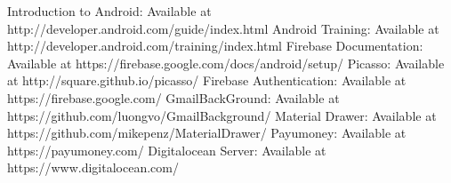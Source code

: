 \begin{thebibliography}{3}
\bibitem{} Introduction to Android: Available at http://developer.android.com/guide/index.html
\bibitem{} Android Training: Available at http://developer.android.com/training/index.html
\bibitem{} Firebase Documentation: Available at https://firebase.google.com/docs/android/setup/
\bibitem{} Picasso: Available at http://square.github.io/picasso/
\bibitem{} Firebase Authentication: Available at https://firebase.google.com/
\bibitem{} GmailBackGround: Available at https://github.com/luongvo/GmailBackground/
\bibitem{} Material Drawer: Available at https://github.com/mikepenz/MaterialDrawer/
\bibitem{} Payumoney: Available at https://payumoney.com/
\bibitem{} Digitalocean Server: Available at https://www.digitalocean.com/ 
\end{thebibliography}